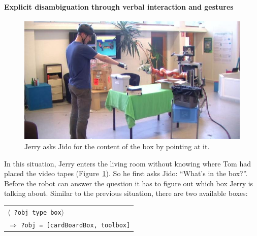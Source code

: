 \documentclass[preprint,3p,times]{elsarticle}
\newcommand{\stmt}[1]{{\footnotesize \tt $\langle$ #1\relax$\rangle$}}
\begin{document}
\paragraph{Explicit disambiguation through verbal interaction and gestures}

\begin{figure}[!ht]
  \centering
  \includegraphics[width=0.9\linewidth]{inTheBox2.jpg}
\caption{Jerry asks Jido for the content of the box by pointing at it.}
  \label{fig|pointing}
\end{figure}

In this situation, Jerry enters the living room without knowing where Tom had
placed the video tapes (Figure~\ref{fig|pointing}). So he first asks Jido:
``What's in the box?''. Before the robot can answer the question it has to
figure out which box Jerry is talking about. Similar to the previous situation,
there are two available boxes: 

\begin{center}
\begin{tabular}{l}
\stmt{?obj type box}\\
\hspace{0.7cm}$\Rightarrow$ {\tt ?obj = [cardBoardBox, toolbox]}
\end{tabular}
\end{center}
\end{document}
